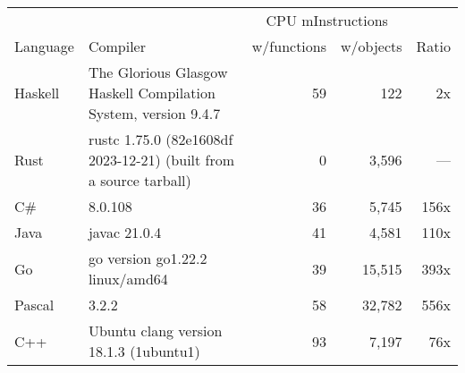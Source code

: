 \documentclass{article}
\begin{document}
      \begin{tabularx}{\linewidth}{lXrrr}
      \toprule
        & & \multicolumn{2}{c}{CPU mInstructions} & \\
        Language & Compiler & w/functions & w/objects & Ratio \\
      \midrule
    Haskell & The Glorious Glasgow Haskell Compilation System, version 9.4.7 & 59 & 122 & 2x \\
Rust & rustc 1.75.0 (82e1608df 2023-12-21) (built from a source tarball) & 0 & 3,596 & --- \\
C\# & 8.0.108 & 36 & 5,745 & 156x \\
Java & javac 21.0.4 & 41 & 4,581 & 110x \\
Go & go version go1.22.2 linux/amd64 & 39 & 15,515 & 393x \\
Pascal & 3.2.2 & 58 & 32,782 & 556x \\
C++ & Ubuntu clang version 18.1.3 (1ubuntu1) & 93 & 7,197 & 76x \\

      \bottomrule
      \end{tabularx}
      
\end{document}
